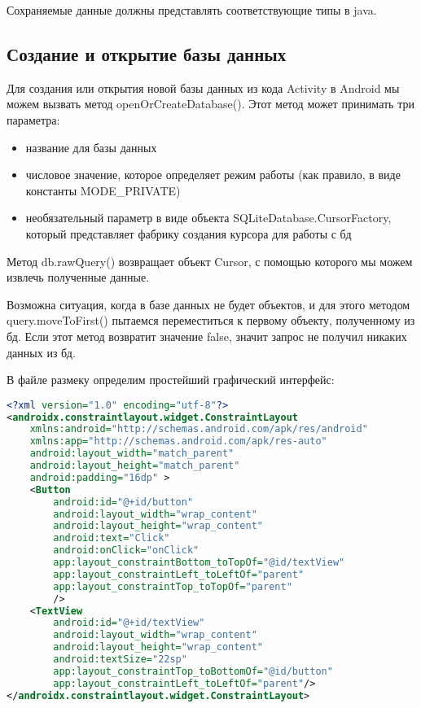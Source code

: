 Сохраняемые данные должны представлять соответствующие типы в java.

\subsection{Создание и открытие базы данных}
Для создания или открытия новой базы данных из кода Activity в Android мы
можем вызвать метод openOrCreateDatabase(). Этот метод может
принимать три параметра:

\begin{itemize}
	\item название для базы данных
	\item числовое значение, которое определяет режим работы (как правило,
		в виде константы MODE\_PRIVATE)
	\item необязательный параметр в виде объекта
		SQLiteDatabase.CursorFactory, который представляет фабрику
		создания курсора для работы с бд
\end{itemize}

Метод db.rawQuery() возвращает объект Cursor, с помощью которого мы
можем извлечь полученные данные.\par
Возможна ситуация, когда в базе данных не будет объектов, и для этого
методом query.moveToFirst() пытаемся переместиться к первому объекту,
полученному из бд. Если этот метод возвратит значение false, значит запрос
не получил никаких данных из бд.\par
В файле размеку определим простейший графический интерфейс:

\begin{lstlisting}[language=XML
	, label=lst:
	]
<?xml version="1.0" encoding="utf-8"?>
<androidx.constraintlayout.widget.ConstraintLayout
    xmlns:android="http://schemas.android.com/apk/res/android"
    xmlns:app="http://schemas.android.com/apk/res-auto"
    android:layout_width="match_parent"
    android:layout_height="match_parent"
    android:padding="16dp" >
    <Button
        android:id="@+id/button"
        android:layout_width="wrap_content"
        android:layout_height="wrap_content"
        android:text="Click"
        android:onClick="onClick"
        app:layout_constraintBottom_toTopOf="@id/textView"
        app:layout_constraintLeft_toLeftOf="parent"
        app:layout_constraintTop_toTopOf="parent"
        />
    <TextView
        android:id="@+id/textView"
        android:layout_width="wrap_content"
        android:layout_height="wrap_content"
        android:textSize="22sp"
        app:layout_constraintTop_toBottomOf="@id/button"
        app:layout_constraintLeft_toLeftOf="parent"/>
</androidx.constraintlayout.widget.ConstraintLayout>
\end{lstlisting}


